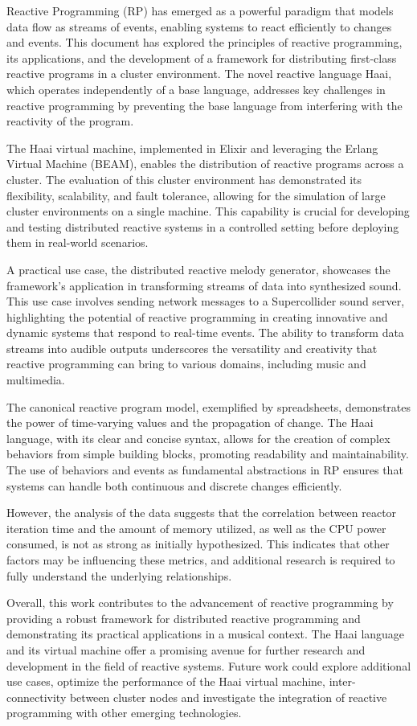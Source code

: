 \documentclass[a4paper]{book}
\begin{document}
Reactive Programming (RP) has emerged as a powerful paradigm that models data flow as streams of events, enabling systems to react efficiently to changes and events. This document has explored the principles of reactive programming, its applications, and the development of a framework for distributing first-class reactive programs in a cluster environment. The novel reactive language Haai, which operates independently of a base language, addresses key challenges in reactive programming by preventing the base language from interfering with the reactivity of the program.

The Haai virtual machine, implemented in Elixir and leveraging the Erlang Virtual Machine (BEAM), enables the distribution of reactive programs across a cluster. The evaluation of this cluster environment has demonstrated its flexibility, scalability, and fault tolerance, allowing for the simulation of large cluster environments on a single machine. This capability is crucial for developing and testing distributed reactive systems in a controlled setting before deploying them in real-world scenarios.

A practical use case, the distributed reactive melody generator, showcases the framework's application in transforming streams of data into synthesized sound. This use case involves sending network messages to a Supercollider sound server, highlighting the potential of reactive programming in creating innovative and dynamic systems that respond to real-time events. The ability to transform data streams into audible outputs underscores the versatility and creativity that reactive programming can bring to various domains, including music and multimedia.

The canonical reactive program model, exemplified by spreadsheets, demonstrates the power of time-varying values and the propagation of change. The Haai language, with its clear and concise syntax, allows for the creation of complex behaviors from simple building blocks, promoting readability and maintainability. The use of behaviors and events as fundamental abstractions in RP ensures that systems can handle both continuous and discrete changes efficiently.

However, the analysis of the data suggests that the correlation between reactor iteration time and the amount of memory utilized, as well as the CPU power consumed, is not as strong as initially hypothesized. This indicates that other factors may be influencing these metrics, and additional research is required to fully understand the underlying relationships.

Overall, this work contributes to the advancement of reactive programming by providing a robust framework for distributed reactive programming and demonstrating its practical applications in a musical context. The Haai language and its virtual machine offer a promising avenue for further research and development in the field of reactive systems. Future work could explore additional use cases, optimize the performance of the Haai virtual machine, inter-connectivity between cluster nodes and investigate the integration of reactive programming with other emerging technologies.

\printbibliography
\end{document}
